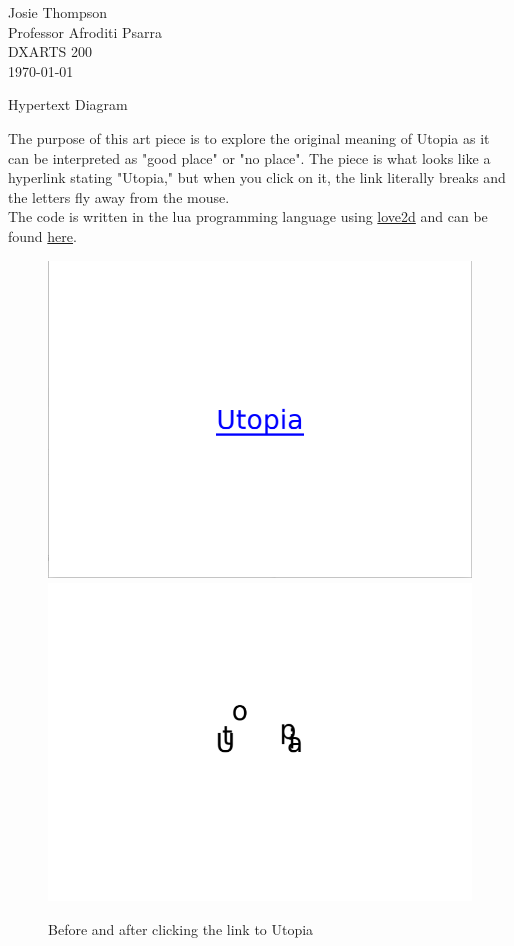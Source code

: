 \documentclass[12pt]{article}
\begin{document}
\begin{flushleft}

    Josie Thompson\\
    Professor Afroditi Psarra\\
    DXARTS 200\\
    \mydate \today\\

\end{flushleft}

\begin{center}
    Hypertext Diagram
\end{center}

The purpose of this art piece is to explore the original meaning of Utopia as it can be interpreted as "good place" or "no place". The piece is what looks like a hyperlink stating "Utopia," but when you click on it, the link literally breaks and the letters fly away from the mouse.\\
The code is written in the lua programming language using \href{https://love2d.org/wiki/Main_Page}{love2d} and can be found \href{https://github.com/josiest/404}{here}.

\begin{figure}[H]
    \centering
    \includegraphics{utopia-2.png}
    \includegraphics{utopia-3.png}
    \caption{Before and after clicking the link to Utopia}
\end{figure}
\end{document}
